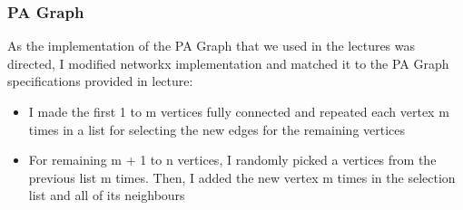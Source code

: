 \documentclass[11pt,a4paper,notitlepage]{article}
\begin{document}
\subsubsection*{PA Graph}
As the implementation of the PA Graph that we used in the lectures was directed, I modified networkx implementation and matched it to the PA Graph specifications provided in lecture:
\begin{itemize}
    \item I made the first 1 to m vertices fully connected and repeated each vertex m times in a list for selecting the new edges for the remaining vertices
    \item For remaining m + 1 to n vertices, I randomly picked a vertices from the previous list m times. Then, I added the new vertex m times in the selection list and all of its neighbours 
\end{itemize} 
\end{document}
